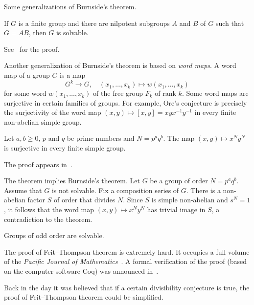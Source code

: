 Some generalizations of Burnside's theorem. 

\begin{theorem}
    \label{thm:KegelWielandt}
    If $G$ is a finite group and there are nilpotent subgroups 
    $A$ and $B$ of $G$ such that 
    $G=AB$, then $G$ is solvable.
\end{theorem}

See~\cite[Theorem 2.4.3]{MR1211633} for the proof.


Another generalization of Burnside's theorem
is based on \emph{word maps}. A word map
of a group $G$ is a map 
\[
G^k\to G,\quad 
(x_1,\dots,x_k)\mapsto w(x_1,\dots,x_k)
\]
for some word $w(x_1,\dots,x_k)$ of the free group $F_k$ of rank $k$. 
Some word maps are surjective in certain families of groups. For example, 
Ore's conjecture is precisely the surjectivity of the word map
$(x,y)\mapsto [x,y]=xyx^{-1}y^{-1}$ in every finite non-abelian simple 
group. 

\begin{theorem}
    Let $a,b\geq0$, $p$ and $q$ be prime numbers and $N=p^aq^b$. The map 
    $(x,y)\mapsto x^Ny^N$ is surjective in every finite simple group. 
\end{theorem}

The proof appears in~\cite{MR3827208}. 

The theorem implies Burnside's theorem. Let $G$ be a group of order
$N=p^aq^b$. Assume that $G$ is not solvable. 
Fix a composition series of $G$. There is a non-abelian factor $S$ 
of order that divides $N$. Since 
$S$ is simple non-abelian and $s^N=1$, it follows that the word map
$(x,y)\mapsto x^Ny^N$ has trivial image in $S$, a contradiction 
to the theorem. 


\begin{theorem}
    Groups of odd order are solvable. 
\end{theorem}

The proof of Feit--Thompson theorem is extremely hard. 
It occupies a full volume of the 
\emph{Pacific Journal of Mathematics}~\cite{MR166261}. 
A formal verification of the proof 
(based on the computer software Coq) 
was announced in~\cite{MR3111271}.  

Back in the day it was believed that if a certain divisibility 
conjecture is true, 
the proof of Feit--Thompson theorem 
could be simplified. 

